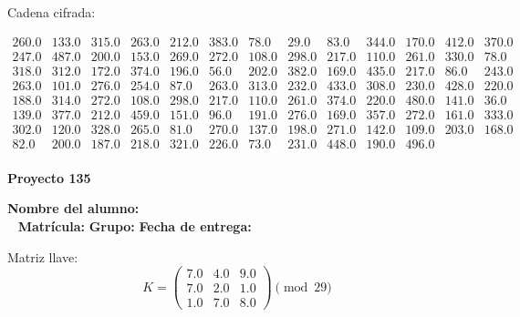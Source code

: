 \documentclass[12pt]{article}
\begin{document}
Cadena cifrada:
\begin{center}
$\begin{array}{lllllllllllll}
260.0 & 133.0 & 315.0 & 263.0 & 212.0 & 383.0 & 78.0 & 29.0 & 83.0 & 344.0 & 170.0 & 412.0 & 370.0\\
247.0 & 487.0 & 200.0 & 153.0 & 269.0 & 272.0 & 108.0 & 298.0 & 217.0 & 110.0 & 261.0 & 330.0 & 78.0\\
318.0 & 312.0 & 172.0 & 374.0 & 196.0 & 56.0 & 202.0 & 382.0 & 169.0 & 435.0 & 217.0 & 86.0 & 243.0\\
263.0 & 101.0 & 276.0 & 254.0 & 87.0 & 263.0 & 313.0 & 232.0 & 433.0 & 308.0 & 230.0 & 428.0 & 220.0\\
188.0 & 314.0 & 272.0 & 108.0 & 298.0 & 217.0 & 110.0 & 261.0 & 374.0 & 220.0 & 480.0 & 141.0 & 36.0\\
139.0 & 377.0 & 212.0 & 459.0 & 151.0 & 96.0 & 191.0 & 276.0 & 169.0 & 357.0 & 272.0 & 161.0 & 333.0\\
302.0 & 120.0 & 328.0 & 265.0 & 81.0 & 270.0 & 137.0 & 198.0 & 271.0 & 142.0 & 109.0 & 203.0 & 168.0\\
82.0 & 200.0 & 187.0 & 218.0 & 321.0 & 226.0 & 73.0 & 231.0 & 448.0 & 190.0 & 496.0\\
\end{array}$
\end{center}

\newpage


\textbf{Proyecto 135}

\textbf{Nombre del alumno:} \underline{\hspace{13cm}}\\\
\vspace{1cm}
\textbf{Matrícula:} \underline{\hspace{4cm}} \hspace{1cm}
\textbf{Grupo:} \underline{\hspace{2cm}}
\textbf{Fecha de entrega:} \underline{\hspace{2cm}}

\medskip

Matriz llave:
\[
K = \begin{pmatrix}
7.0 & 4.0 & 9.0\\
7.0 & 2.0 & 1.0\\
1.0 & 7.0 & 8.0
\end{pmatrix} \pmod{29}
\]
\end{document}
